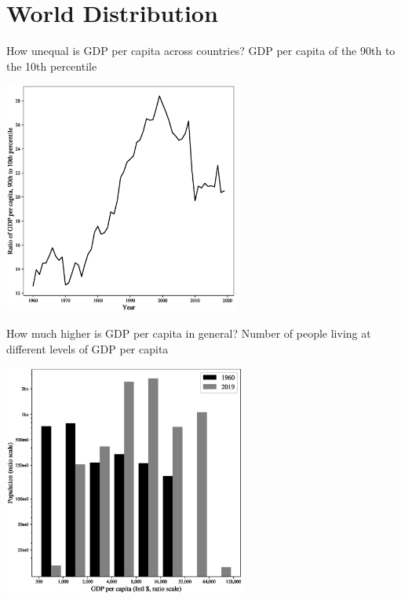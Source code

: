\section{World Distribution}
\begin{frame}{How unequal is GDP per capita across countries?}
GDP per capita of the 90th to the 10th percentile
\begin{center}
\includegraphics[height = 3in]{../Figures/fig-ch3-fig10.eps}
\end{center}
\end{frame}

\begin{frame}{How much higher is GDP per capita in general?}
Number of people living at different levels of GDP per capita
\begin{center}
\includegraphics[height = 3in]{../Figures/fig-ch3-fig11.eps}
\end{center}
\end{frame}

